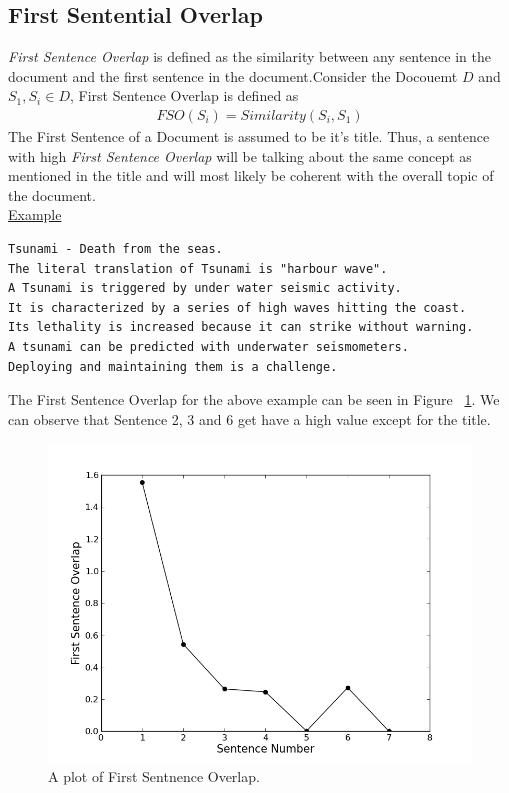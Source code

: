 \documentclass[BTech]{nitgoathesis}
\begin{document}
\pagebreak
\subsection{First Sentential Overlap}
\emph{First Sentence Overlap} \cite{mead} is defined as the similarity between any sentence in the document and the first sentence in the document.Consider the Docouemt $D$ and $S_1,S_i \in D $, First Sentence Overlap is defined as 
\begin{align}
FSO(S_i) = Similarity(S_i,S_1)
\end{align} 
The First Sentence of a Document is assumed to be it's title. Thus, a sentence with high \emph{First Sentence Overlap} will be talking about the same concept as mentioned in the title and will most likely be coherent with the overall topic of the document.\\

{\noindent \large \underline{Example}} 
\begin{lstlisting}
Tsunami - Death from the seas.
The literal translation of Tsunami is "harbour wave".
A Tsunami is triggered by under water seismic activity.
It is characterized by a series of high waves hitting the coast.
Its lethality is increased because it can strike without warning.
A tsunami can be predicted with underwater seismometers.
Deploying and maintaining them is a challenge.
\end{lstlisting}
The First Sentence Overlap for the above example can be seen in Figure ~\ref{fig:fso}. We can observe that Sentence 2, 3 and 6 get have a high value except for the title.

\begin{figure}[h!]
  \centering
    \includegraphics[width=.9\textwidth]{images/fso}
    \caption{A plot of First Sentnence Overlap.}
    \label{fig:fso}
\end{figure}
\pagebreak
\end{document}

